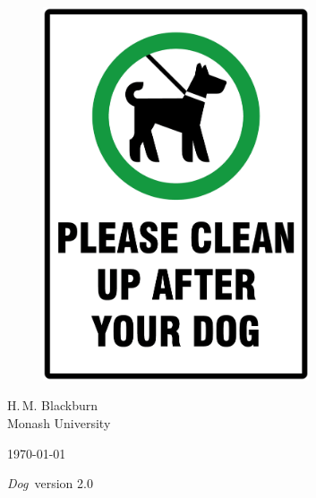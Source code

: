 \documentclass[11pt,a4paper]{report}
\newcommand{\Dog}{\emph{Dog}}
\begin{document}
\begin{titlepage}
\centering

\vspace*{\fill}


\vspace{\fill}

\begin{figure}[h]
\begin{center}
  \includegraphics[width=0.7\textwidth]{A56}
\end{center}
\end{figure}

\vspace{\fill}

{\large H.\,M. Blackburn}\\
Monash University

\vspace{\fill}

\today

\Dog\ version 2.0

\vspace*{\fill}

\end{titlepage}

\end{document}
